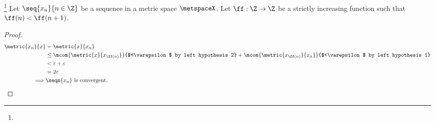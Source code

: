 \begin{proposition}
\footnote{
  }
Let $\seq{x_n}{n\in\Z}$ be a sequence in a metric space $\metspaceX$.
Let $\ff:\Z\to\Z$ be a strictly increasing function such that $\ff(n)<\ff(n+1)$.
\end{proposition}
\begin{proof}
\begin{align*}
  \metric{x_n}{x}
    &= \metric{x}{x_n}
  \\&\le \mcom{\metric{x}{x_{\ff(n)}}}{$<\varepsilon$ by left hypothesis 2} + 
         \mcom{\metric{x_{\ff(n)}}{x_n}}{$<\varepsilon$ by left hypothesis 1}
  \\&<   \varepsilon + \varepsilon
  \\&=   2\varepsilon
  \\\implies& \seqn{x_n} \text{ is convergent.}
\end{align*}
\end{proof}




